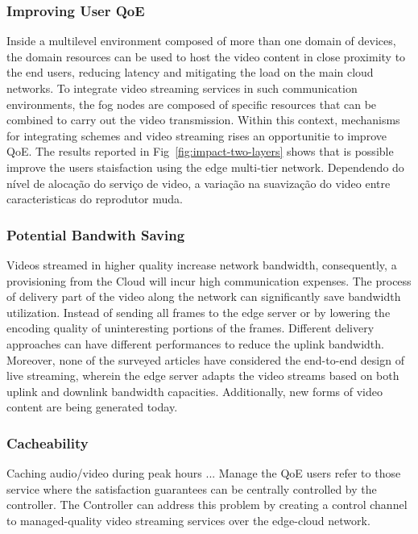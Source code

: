 \subsubsection{Improving User QoE}

Inside a multilevel environment composed of more than one domain of devices, the domain resources can be used to host the video content in close proximity to the end users, reducing latency and mitigating the load on the main cloud networks. To integrate video streaming services in such communication environments, the fog nodes are composed of specific resources that can be combined to carry out the video transmission. Within this context, mechanisms for integrating schemes and video streaming rises an opportunitie to improve QoE.%
The results reported in Fig~\ref{fig:impact-two-layers} shows that is possible improve the users staisfaction using the edge multi-tier network. Dependendo do nível de alocação do serviço de video, a variação na suavização do video entre caracteristicas do reprodutor muda. 

\subsubsection{Potential Bandwith Saving}
Videos streamed in higher quality increase network bandwidth, consequently, a provisioning from the Cloud will incur high communication expenses. 
The process of delivery part of the video along the network can significantly save bandwidth utilization. Instead of sending all frames to the edge server or by lowering the encoding quality of uninteresting portions of the frames. Different delivery approaches can have different performances to reduce the uplink bandwidth. Moreover, none of the surveyed articles have considered the end-to-end design of live streaming, wherein the edge server adapts the video streams based on both uplink and downlink bandwidth capacities. Additionally, new forms of video content are being generated today.


\subsubsection{Cacheability}

Caching audio/video during peak hours ...
Manage the QoE users refer to those service where the satisfaction guarantees can be centrally controlled by the controller. The Controller can address this problem by creating a control channel to managed-quality video streaming services over the edge-cloud network.